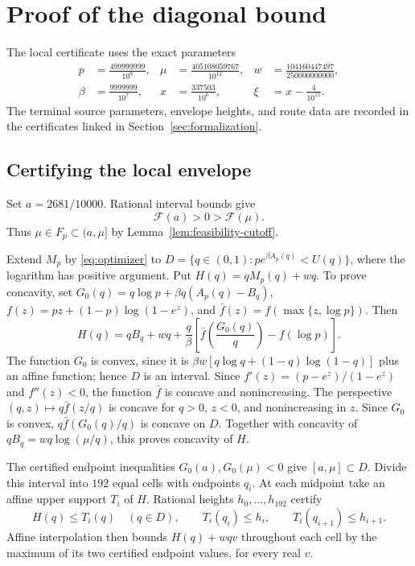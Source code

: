 \section{Proof of the diagonal bound}
\label{sec:concrete-bound}

The local certificate uses the exact parameters
\[
 \begin{aligned}
 p&=\frac{499999999}{10^9},&
 \mu&=\frac{405108059767}{10^{12}},&
 w&=\frac{104160447497}{250000000000},\\
 \beta&=\frac{9999999}{10^7},&
 x&=\frac{337503}{10^6},&
 \xi&=x-\frac4{10^{11}}.
 \end{aligned}
\]
The terminal source parameters, envelope heights, and route data are
recorded in the certificates linked in Section~\ref{sec:formalization}.

\subsection{Certifying the local envelope}

Set $a=2681/10000$. Rational interval bounds give
\[
 \mathcal F(a)>0>\mathcal F(\mu).
\]
Thus $\mu\in F_p\subset(a,\mu]$ by Lemma~\ref{lem:feasibility-cutoff}.

Extend $M_p$ by \eqref{eq:optimizer} to
$D=\{q\in(0,1):p e^{\beta A_p(q)}<U(q)\}$, where the logarithm has
positive argument. Put $H(q)=qM_p(q)+wq$. To prove concavity, set
$G_0(q)=q\log p+\beta q(A_p(q)-B_q)$,
$f(z)=pz+(1-p)\log(1-e^z)$, and
$\bar f(z)=f(\max\{z,\log p\})$. Then
\[
 H(q)=qB_q+wq+
 \frac q\beta\left[\bar f\left(\frac{G_0(q)}q\right)-f(\log p)\right].
\]
The function $G_0$ is convex, since it is
$\beta w[q\log q+(1-q)\log(1-q)]$ plus an affine function;
hence $D$ is an interval. Since $f'(z)=(p-e^z)/(1-e^z)$ and
$f''(z)<0$, the function $\bar f$ is concave and nonincreasing.
The perspective $(q,z)\mapsto q\bar f(z/q)$ is concave for
$q>0$, $z<0$, and nonincreasing in $z$. Since $G_0$ is convex,
$q\bar f(G_0(q)/q)$ is concave on $D$.
Together with concavity of $qB_q=wq\log(\mu/q)$, this proves concavity of $H$.

The certified endpoint inequalities $G_0(a),G_0(\mu)<0$ give
$[a,\mu]\subset D$. Divide this interval into $192$ equal cells
with endpoints $q_i$. At each midpoint take an affine upper support
$T_i$ of $H$. Rational heights $h_0,\ldots,h_{192}$ certify
\[
 H(q)\le T_i(q)\quad(q\in D),\qquad
 T_i(q_i)\le h_i,\qquad T_i(q_{i+1})\le h_{i+1}.
\]
Affine interpolation then bounds $H(q)+wqv$ throughout each cell by
the maximum of its two certified endpoint values, for every real $v$.

